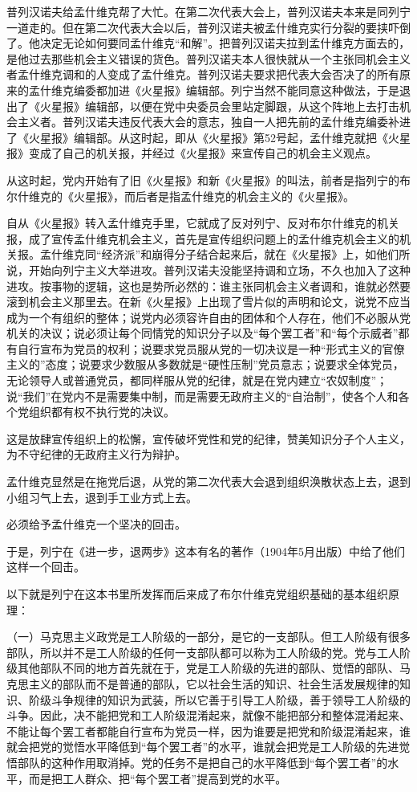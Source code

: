 普列汉诺夫给孟什维克帮了大忙。在第二次代表大会上，普列汉诺夫本来是同列宁一道走的。但在第二次代表大会以后，普列汉诺夫被孟什维克实行分裂的要挟吓倒了。他决定无论如何要同孟什维克“和解”。把普列汉诺夫拉到孟什维克方面去的，是他过去那些机会主义错误的货色。普列汉诺夫本人很快就从一个主张同机会主义者孟什维克调和的人变成了孟什维克。普列汉诺夫要求把代表大会否决了的所有原来的孟什维克编委都加进《火星报》编辑部。列宁当然不能同意这种做法，于是退出了《火星报》编辑部，以便在党中央委员会里站定脚跟，从这个阵地上去打击机会主义者。普列汉诺夫违反代表大会的意志，独自一人把先前的孟什维克编委补进了《火星报》编辑部。从这时起，即从《火星报》第52号起，孟什维克就把《火星报》变成了自己的机关报，并经过《火星报》来宣传自己的机会主义观点。

从这时起，党内开始有了旧《火星报》和新《火星报》的叫法，前者是指列宁的布尔什维克的《火星报》，而后者是指孟什维克的机会主义的《火星报》。

自从《火星报》转入孟什维克手里，它就成了反对列宁、反对布尔什维克的机关报，成了宣传孟什维克机会主义，首先是宣传组织问题上的孟什维克机会主义的机关报。孟什维克同“经济派”和崩得分子结合起来后，就在《火星报》上，如他们所说，开始向列宁主义大举进攻。普列汉诺夫没能坚持调和立场，不久也加入了这种进攻。按事物的逻辑，这也是势所必然的：谁主张同机会主义者调和，谁就必然要滚到机会主义那里去。在新《火星报》上出现了雪片似的声明和论文，说党不应当成为一个有组织的整体；说党内必须容许自由的团体和个人存在，他们不必服从党机关的决议；说必须让每个同情党的知识分子以及“每个罢工者”和“每个示威者”都有自行宣布为党员的权利；说要求党员服从党的一切决议是一种“形式主义的官僚主义的”态度；说要求少数服从多数就是“硬性压制”党员意志；说要求全体党员，无论领导人或普通党员，都同样服从党的纪律，就是在党内建立“农奴制度”；说“我们”在党内不是需要集中制，而是需要无政府主义的“自治制”，使各个人和各个党组织都有权不执行党的决议。

这是放肆宣传组织上的松懈，宣传破坏党性和党的纪律，赞美知识分子个人主义，为不守纪律的无政府主义行为辩护。

孟什维克显然是在拖党后退，从党的第二次代表大会退到组织涣散状态上去，退到小组习气上去，退到手工业方式上去。

必须给予孟什维克一个坚决的回击。

于是，列宁在《进一步，退两步》这本有名的著作（1904年5月出版）中给了他们这样一个回击。

以下就是列宁在这本书里所发挥而后来成了布尔什维克党组织基础的基本组织原理：

（一）马克思主义政党是工人阶级的一部分，是它的一支部队。但工人阶级有很多部队，所以并不是工人阶级的任何一支部队都可以称为工人阶级的党。党与工人阶级其他部队不同的地方首先就在于，党是工人阶级的先进的部队、觉悟的部队、马克思主义的部队而不是普通的部队，它以社会生活的知识、社会生活发展规律的知识、阶级斗争规律的知识为武装，所以它善于引导工人阶级，善于领导工人阶级的斗争。因此，决不能把党和工人阶级混淆起来，就像不能把部分和整体混淆起来、不能让每个罢工者都能自行宣布为党员一样，因为谁要是把党和阶级混淆起来，谁就会把党的觉悟水平降低到“每个罢工者”的水平，谁就会把党是工人阶级的先进觉悟部队的这种作用取消掉。党的任务不是把自己的水平降低到“每个罢工者”的水平，而是把工人群众、把“每个罢工者”提高到党的水平。

